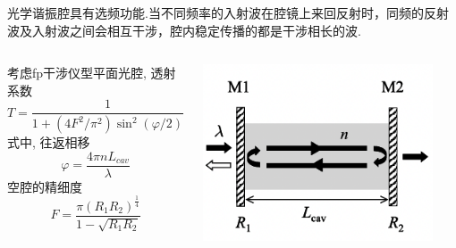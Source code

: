 \begin{frame} 
\frametitle{}   
{\Bullet}光学谐振腔具有选频功能.当不同频率的入射波在腔镜上来回反射时，同频的反射波及入射波之间会相互干涉，腔内稳定传播的都是干涉相长的波.
\begin{columns}[T,onlytextwidth]
     考虑fp干涉仪型平面光腔, 透射系数
     \[ T = \frac{1}{1+(4F^2/\pi^2)\sin ^2(\varphi /2)}\]
    式中, 往返相移
    \[ \varphi = \frac{4\pi n L_{cav}}{\lambda}\]
    空腔的精细度
    \[ F = \frac{\pi (R_1 R_2)^{\frac{1}{4}}}{1-\sqrt{R_1 R_2}}\]
        \begin{center}
             \includegraphics[width=0.9\textwidth]{figs/2022-05-22-23-47-55.png}
        \end{center}
  \end{columns}
\end{frame}

